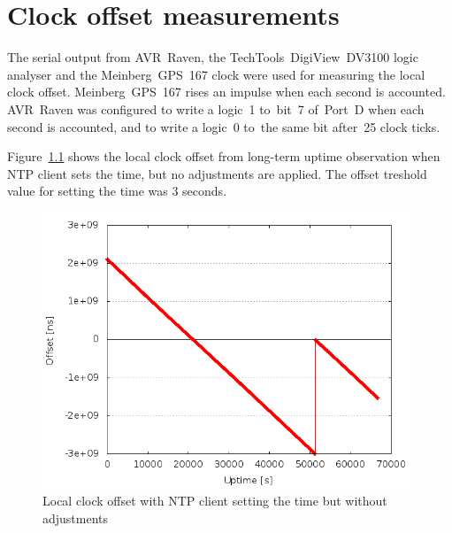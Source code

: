 \chapter{Clock offset measurements}\label{app:offset}
The serial output from AVR~Raven,
the TechTools~DigiView~DV3100 logic analyser and the Meinberg~GPS~167 clock
were used for measuring the local clock offset.
Meinberg~GPS~167 rises an impulse when each second is accounted.
AVR~Raven was configured to write a logic~1
to~bit~7 of~Port~D when each second is accounted,
and to write a logic~0 to~the same bit after~25 clock ticks.

Figure~\ref{fig:app-ntp-set-time} shows the local clock offset from long-term uptime
observation when NTP client sets the time, but no adjustments are applied.
The offset treshold value for setting the time was 3 seconds.
\begin{figure}[H]
  \centering
  \includegraphics[width=11cm,keepaspectratio]{fig/set-time-3s.png}
  \caption{Local clock offset with NTP client setting the time but without adjustments}
  \label{fig:app-ntp-set-time}
\end{figure}

